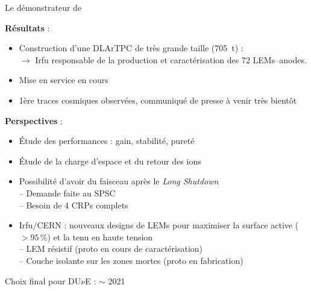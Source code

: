     \begin{frame}{Le démonstrateur de \SSS{}}
        \begin{scriptsize}
            \textbf{Résultats} :
            \begin{itemize}
                \item Construction d'une DLArTPC de très grande taille (\SI{705}{\tonne}) : \textcolor{green}{\checkmark} \\ $\to$ Irfu responsable de la production et caractérisation des 72 LEMs--anodes. 
                \item Mise en service en cours
                \item 1ère traces cosmiques observées, communiqué de presse à venir très bientôt
            \end{itemize}\vspace{0.2cm}\pause
            \textbf{Perspectives} :
            \begin{itemize}
                \item Étude des performances : gain, stabilité, pureté
                \item Étude de la charge d'espace et du retour des ions
                \item Possibilité d'avoir du faisceau après le \textit{Long Shutdown} \\
                -- Demande faite au SPSC\\
                -- Besoin de 4 CRPs complets
                \item Irfu/CERN : nouveaux designs de LEMs pour maximiser la surface active ($>95\,\%$) et la tenu en haute tension\\
                    -- LEM résistif (proto en cours de caractérisation)\\
                    -- Couche isolante sur les zones mortes (proto en fabrication)
            \end{itemize}
            Choix final pour DU$\nu$E : $\sim$ 2021
        \end{scriptsize}
    \end{frame}

